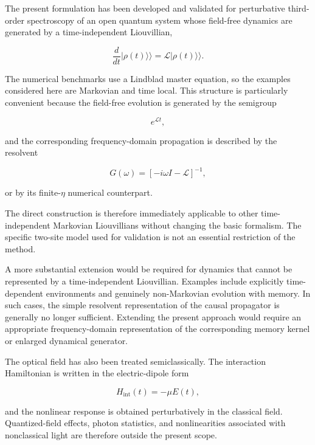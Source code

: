 \documentclass[11pt]{article}
\begin{document}
The present formulation has been developed and validated for
perturbative third-order spectroscopy of an open quantum system whose
field-free dynamics are generated by a time-independent Liouvillian,

\begin{equation}
\frac{d}{dt}
|\rho(t)\rangle\rangle
=
\mathcal{L}
|\rho(t)\rangle\rangle.
\end{equation}

The numerical benchmarks use a Lindblad master equation, so the
examples considered here are Markovian and time local.  This structure
is particularly convenient because the field-free evolution is
generated by the semigroup

\begin{equation}
e^{\mathcal{L}t},
\end{equation}

and the corresponding frequency-domain propagation is described by
the resolvent

\begin{equation}
G(\omega)
=
\left[
-i\omega I-\mathcal{L}
\right]^{-1},
\end{equation}

or by its finite-$\eta$ numerical counterpart.

The direct construction is therefore immediately applicable to other
time-independent Markovian Liouvillians without changing the basic
formalism.  The specific two-site model used for validation is not an
essential restriction of the method.

A more substantial extension would be required for dynamics that
cannot be represented by a time-independent Liouvillian.  Examples
include explicitly time-dependent environments and genuinely
non-Markovian evolution with memory.  In such cases, the simple
resolvent representation of the causal propagator is generally no
longer sufficient.  Extending the present approach would require an
appropriate frequency-domain representation of the corresponding
memory kernel or enlarged dynamical generator.

The optical field has also been treated semiclassically.  The
interaction Hamiltonian is written in the electric-dipole form

\begin{equation}
H_{\mathrm{int}}(t)
=
-\mu E(t),
\end{equation}

and the nonlinear response is obtained perturbatively in the classical
field.  Quantized-field effects, photon statistics, and nonlinearities
associated with nonclassical light are therefore outside the present
scope.
\end{document}
